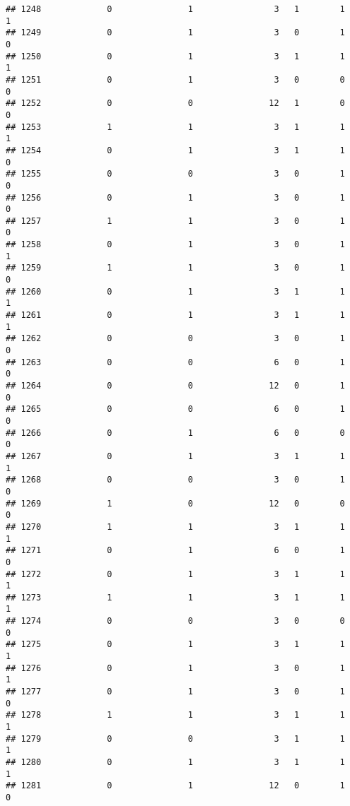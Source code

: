 \documentclass[]{article}
\begin{document}
\begin{verbatim}
## 1248             0               1                3   1        1        1
## 1249             0               1                3   0        1        0
## 1250             0               1                3   1        1        1
## 1251             0               1                3   0        0        0
## 1252             0               0               12   1        0        0
## 1253             1               1                3   1        1        1
## 1254             0               1                3   1        1        0
## 1255             0               0                3   0        1        0
## 1256             0               1                3   0        1        0
## 1257             1               1                3   0        1        0
## 1258             0               1                3   0        1        1
## 1259             1               1                3   0        1        0
## 1260             0               1                3   1        1        1
## 1261             0               1                3   1        1        1
## 1262             0               0                3   0        1        0
## 1263             0               0                6   0        1        0
## 1264             0               0               12   0        1        0
## 1265             0               0                6   0        1        0
## 1266             0               1                6   0        0        0
## 1267             0               1                3   1        1        1
## 1268             0               0                3   0        1        0
## 1269             1               0               12   0        0        0
## 1270             1               1                3   1        1        1
## 1271             0               1                6   0        1        0
## 1272             0               1                3   1        1        1
## 1273             1               1                3   1        1        1
## 1274             0               0                3   0        0        0
## 1275             0               1                3   1        1        1
## 1276             0               1                3   0        1        1
## 1277             0               1                3   0        1        0
## 1278             1               1                3   1        1        1
## 1279             0               0                3   1        1        1
## 1280             0               1                3   1        1        1
## 1281             0               1               12   0        1        0

\end{verbatim}
\end{document}
